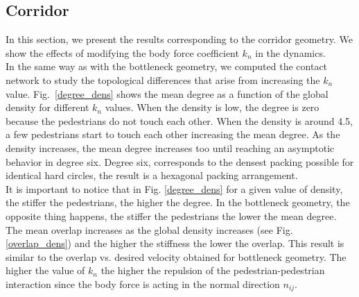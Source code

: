 \documentclass[preprint,12pt]{elsarticle}
\begin{document}
\subsection{\label{corridor} Corridor}

In this section, we present the results corresponding to the corridor geometry. We show the effects of modifying the body force coefficient $k_n$ in the dynamics.\\

In the same way as with the bottleneck geometry, we computed the contact network to study the topological differences that arise from increasing the $k_n$ value. Fig.~\ref{degree_dens} shows the mean degree as a function of the global density for different $k_n$ values. When the density is low,  the degree is zero because the pedestrians do not touch each other. When the density is around 4.5, a few pedestrians start to touch each other increasing the mean degree. As the density increases, the mean degree increases too until reaching an asymptotic behavior in degree six. Degree six, corresponds to the densest packing possible for identical hard circles, the result is a hexagonal packing arrangement.\\

It is important to notice that in Fig. \ref{degree_dens} for a given value of density, the stiffer the pedestrians, the higher the degree. In the bottleneck geometry, the opposite thing happens, the stiffer the pedestrians the lower the mean degree.\\

The mean overlap increases as the global density increases (see Fig. \ref{overlap_dens}) and the higher the stiffness the lower the overlap. This result is similar to the overlap vs. desired velocity obtained for bottleneck geometry. The higher the value of $k_n$ the higher the repulsion of the pedestrian-pedestrian interaction since the body force is acting in the normal direction $n_{ij}$.\\
\end{document}
